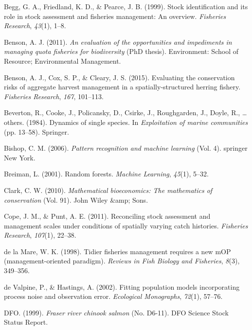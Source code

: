 \documentclass[12pt,]{scrartcl}
\begin{document}
\hypertarget{ref-begg1999stock}{}
Begg, G. A., Friedland, K. D., \& Pearce, J. B. (1999). Stock
identification and its role in stock assessment and fisheries
management: An overview. \emph{Fisheries Research}, \emph{43}(1), 1--8.

\hypertarget{ref-benson2011evaluation}{}
Benson, A. J. (2011). \emph{An evaluation of the opportunities and
impediments in managing quota fisheries for biodiversity} (PhD thesis).
Environment: School of Resource; Environmental Management.

\hypertarget{ref-benson2015evaluating}{}
Benson, A. J., Cox, S. P., \& Cleary, J. S. (2015). Evaluating the
conservation risks of aggregate harvest management in a
spatially-structured herring fishery. \emph{Fisheries Research},
\emph{167}, 101--113.

\hypertarget{ref-beverton1984dynamics}{}
Beverton, R., Cooke, J., Policansky, D., Csirke, J., Roughgarden, J.,
Doyle, R., \ldots{} others. (1984). Dynamics of single species. In
\emph{Exploitation of marine communities} (pp. 13--58). Springer.

\hypertarget{ref-bishop2006pattern}{}
Bishop, C. M. (2006). \emph{Pattern recognition and machine learning}
(Vol. 4). springer New York.

\hypertarget{ref-breiman2001random}{}
Breiman, L. (2001). Random forests. \emph{Machine Learning},
\emph{45}(1), 5--32.

\hypertarget{ref-clark2010mathematical}{}
Clark, C. W. (2010). \emph{Mathematical bioeconomics: The mathematics of
conservation} (Vol. 91). John Wiley \&amp; Sons.

\hypertarget{ref-cope2011reconciling}{}
Cope, J. M., \& Punt, A. E. (2011). Reconciling stock assessment and
management scales under conditions of spatially varying catch histories.
\emph{Fisheries Research}, \emph{107}(1), 22--38.

\hypertarget{ref-de-la-Mare1998Tidier-fisherie}{}
de la Mare, W. K. (1998). Tidier fisheries management requires a new mOP
(management-oriented paradigm). \emph{Reviews in Fish Biology and
Fisheries}, \emph{8}(3), 349--356.

\hypertarget{ref-de2002fitting}{}
de Valpine, P., \& Hastings, A. (2002). Fitting population models
incorporating process noise and observation error. \emph{Ecological
Monographs}, \emph{72}(1), 57--76.

\hypertarget{ref-DFO1999Fraser-River-Ch}{}
DFO. (1999). \emph{Fraser river chinook salmon} (No. D6-11). DFO Science
Stock Status Report.
\end{document}
